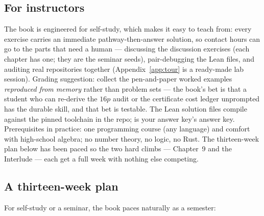 \documentclass[11pt]{report}
\begin{document}
\subsection*{For instructors}

The book is engineered for self-study, which makes it easy to teach
from: every exercise carries an immediate pathway-then-answer solution,
so contact hours can go to the parts that need a human --- discussing
the discussion exercises (each chapter has one; they are the seminar
seeds), pair-debugging the Lean files, and auditing real repositories
together (Appendix~\ref{app:tour} is a ready-made lab session). Grading
suggestion: collect the pen-and-paper worked examples \emph{reproduced
from memory} rather than problem sets --- the book's bet is that a
student who can re-derive the $16p$ audit or the certificate cost
ledger unprompted has the durable skill, and that bet is testable. The
Lean solution files compile against the pinned toolchain in the repo;
 is your answer key's answer key. Prerequisites
in practice: one programming course (any language) and comfort with
high-school algebra; no number theory, no logic, no Rust. The
thirteen-week plan below has been paced so the two hard climbs ---
Chapter~9 and the Interlude --- each get a full week with nothing else
competing.

\subsection*{A thirteen-week plan}

For self-study or a seminar, the book paces naturally as a semester:
\end{document}
